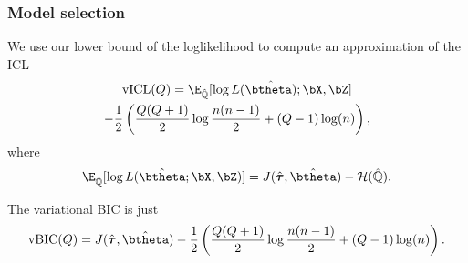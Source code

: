 \documentclass{beamer}\usepackage[]{graphicx}\usepackage[]{color}
\begin{document}
\begin{frame}
  \frametitle{Model selection}

  We use our lower bound of the  loglikelihood to compute an approximation of the ICL
  \begin{multline*}
  \mathrm{vICL}(Q) = \E_{\hat{\mathbb{Q}}} [\log L(\hat{\btheta)};\bX,\bZ] \\ - \frac{1}{2} \left(\frac{Q(Q+1)}{2} \log \frac{n(n-1)}{2} + (Q-1) \log (n) \right),
\end{multline*}
where
    \begin{equation*}
      \E_{\hat{\mathbb{Q}}} [\log L(\hat\btheta; \bX,\bZ)] = J(\hat{\boldsymbol\tau},\hat\btheta) - \mathcal{H}(\hat{\mathbb{Q}}).
    \end{equation*}

    The variational BIC is just
    \begin{equation*}
  \mathrm{vBIC}(Q) = J(\hat{\boldsymbol\tau},\hat\btheta) - \frac{1}{2} \left(\frac{Q(Q+1)}{2} \log \frac{n(n-1)}{2} + (Q-1) \log (n) \right).
    \end{equation*}

\end{frame}
\end{document}
